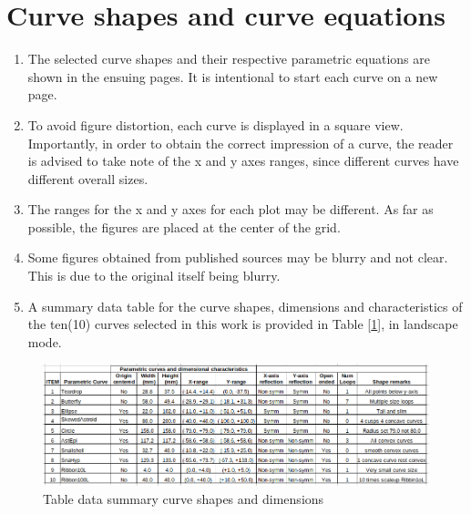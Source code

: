 \section{Curve shapes and curve equations}

\begin{enumerate}
	\item The selected curve shapes and their respective parametric equations are shown in the ensuing pages. It is intentional to start each curve on a new page.
	
	\item To avoid figure distortion, each curve is displayed in a square view. Importantly, in order to obtain the correct impression of a curve, the reader is advised to take note of the x and y axes ranges, since different curves have different overall sizes.
	
	
	\item The ranges for the x and y axes for each plot may be different. As far as possible, the figures are placed at the center of the grid.	
	
	\item Some figures obtained from published sources may be blurry and not clear. This is due to the original itself being blurry.
	
	
	\item A summary data table for the curve shapes, dimensions and characteristics of the ten(10) curves selected in this work is provided in Table [\ref{Table data parametric curve dimensions.png}], in landscape mode. 
	
\end{enumerate}

\clearpage
\pagebreak

\begin{landscape}
	\begin{figure}
		\caption{Table data summary curve shapes and dimensions}
		\label{Table data parametric curve dimensions.png}
		\centering
		\includegraphics[width=1.70\textwidth]{Images/Chap3/Parametric-Curve-shapes-and-dimensions.png} 
	\end{figure}	
\end{landscape}

